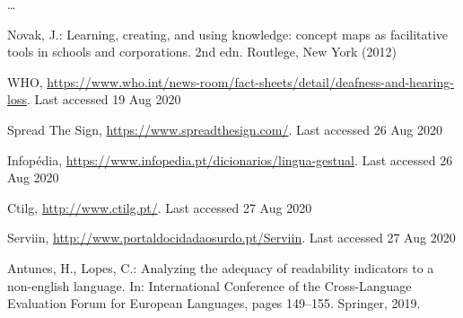 \documentclass[runningheads]{llncs}
\begin{document}
\dots

%
%
%
% 
% 
%
\begin{thebibliography}{8}
        Novak, J.: Learning, creating, and using knowledge: concept maps as facilitative tools in schools and corporations. 2nd edn. Routlege, New York (2012)

        WHO, \url{https://www.who.int/news-room/fact-sheets/detail/deafness-and-hearing-loss}. Last accessed 19 Aug 2020

        Spread The Sign, \url{https://www.spreadthesign.com/}. Last accessed 26 Aug 2020

        Infopédia, \url{https://www.infopedia.pt/dicionarios/lingua-gestual}. Last accessed 26 Aug 2020

        Ctilg, \url{http://www.ctilg.pt/}. Last accessed 27 Aug 2020

        Serviin, \url{http://www.portaldocidadaosurdo.pt/Serviin}. Last accessed 27 Aug 2020

        Antunes, H., Lopes, C.: Analyzing the adequacy of readability indicators to a non-english language.
        In: International Conference of the Cross-Language Evaluation Forum for European Languages,
        pages 149--155. Springer, 2019.





\end{thebibliography}
\end{document}
